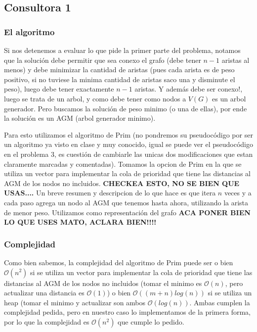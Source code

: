 \documentclass[A4paper,oneside,fleqn,11pt]{article}
\theoremstyle{definition}
\begin{document}
\subsection{Consultora 1}

\subsubsection{El algoritmo}
Si nos detenemos a evaluar lo que pide la primer parte del problema, notamos que la solución debe permitir que sea conexo el grafo (debe tener $n-1$ aristas al menos) y debe minimizar la cantidad de aristas (pues cada arista es de peso positivo, si no tuviese la minima cantidad de aristas saco una y disminute el peso), luego debe tener exactamente $n-1$ aristas. Y además debe ser conexo!, luego se trata de un arbol, y como debe tener como nodos a $V(G)$ es un arbol generador. Pero buscamos la solución de peso minimo (o una de ellas), por ende la solución es un AGM (arbol generador minimo). 

Para esto utilizamos el algoritmo de Prim (no pondremos su pseudocódigo por ser un algoritmo ya visto en clase y muy conocido, igual se puede ver el pseudocódigo en el problema 3, es cuestión de cambiarle las unicas dos modificaciones que estan claramente marcadas y comentadas). Tomamos la opcion de Prim en la que se utiliza un vector para implementar la cola de prioridad que tiene las distancias al AGM de los nodos no incluidos. \textbf{CHECKEA ESTO, NO SE BIEN QUE USAS....} Un breve resumen y descripcion de lo que hace es que itera $n$ veces y a cada paso agrega un nodo al AGM que tenemos hasta ahora, utilizando la arista de menor peso. Utilizamos como representación del grafo \textbf{ACA PONER BIEN LO QUE USES MATO, ACLARA BIEN!!!!}


\subsubsection{Complejidad}

Como bien sabemos, la complejidad del algoritmo de Prim puede ser o bien $\mathcal{O} (n^2)$ si se utiliza un vector para implementar la cola de prioridad que tiene las distancias al AGM de los nodos no incluidos (tomar el minimo es $\mathcal{O} (n)$, pero actualizar una distancia es $\mathcal{O} (1)$) o bien $\mathcal{O} ((m+n) log(n))$ si se utiliza un heap (tomar el minimo y actualizar son ambos $\mathcal{O} (log(n))$. Ambas cumplen la complejidad pedida, pero en nuestro caso lo implementamos de la primera forma, por lo que la complejidad es $\mathcal{O} (n^2)$ que cumple lo pedido.
\end{document}
